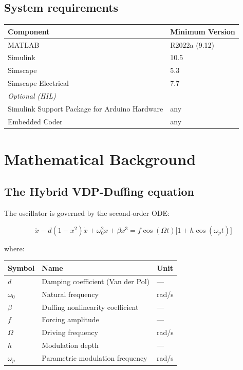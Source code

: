 \documentclass[12pt,a4paper]{article}
\begin{document}
\subsection{System requirements}
\begin{center}
\begin{tabular}{ll}
\toprule
\textbf{Component} & \textbf{Minimum Version}\\
\midrule
MATLAB             & R2022a (9.12)\\
Simulink           & 10.5\\
Simscape           & 5.3\\
Simscape Electrical & 7.7\\
\midrule
\textit{Optional (HIL)} & \\
Simulink Support Package for Arduino Hardware & any\\
Embedded Coder     & any\\
\bottomrule
\end{tabular}
\end{center}

\section{Mathematical Background}

\subsection{The Hybrid VDP-Duffing equation}

The oscillator is governed by the second-order ODE:

\begin{equation}
  \ddot{x} - d(1-x^2)\dot{x} + \omega_0^2 x + \beta x^3
  = f\cos(\Omega t)\bigl[1 + h\cos(\omega_p t)\bigr]
  \label{eq:ode}
\end{equation}

\noindent where:

\begin{center}
\begin{tabular}{lll}
\toprule
Symbol & Name & Unit\\
\midrule
$d$          & Damping coefficient (Van der Pol)   & ---\\
$\omega_0$   & Natural frequency                    & rad/s\\
$\beta$      & Duffing nonlinearity coefficient     & ---\\
$f$          & Forcing amplitude                    & ---\\
$\Omega$     & Driving frequency                    & rad/s\\
$h$          & Modulation depth                     & ---\\
$\omega_p$   & Parametric modulation frequency      & rad/s\\
\bottomrule
\end{tabular}
\end{center}
\end{document}
